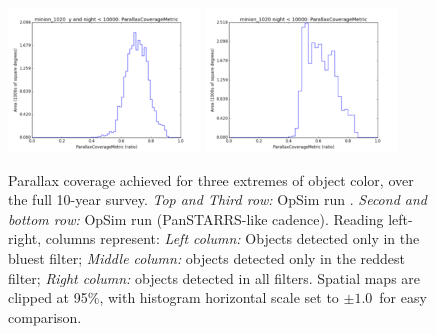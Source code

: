 \begin{figure}[ht]
\begin{center}
  \includegraphics[width=2.0in]{./figs/milkyway/astromPanels/MW_Astrom_paCovge_PanSTARRS_y_hst.png}
  \includegraphics[width=2.0in]{./figs/milkyway/astromPanels/MW_Astrom_paCovge_PanSTARRS_10y_hst.png}
  \end{center}
  \caption{Parallax coverage achieved for three extremes of object color, over the full 10-year survey. {\it Top and Third row:} OpSim run . {\it Second and bottom row:} OpSim run  (PanSTARRS-like cadence). Reading left-right, columns represent: {\it Left column:} Objects detected only in the bluest filter; {\it Middle column:} objects detected only in the reddest filter; {\it Right column:} objects detected in all filters. Spatial maps are clipped at 95\%, with histogram horizontal scale set to $\pm 1.0$~for easy comparison.}
  \label{fig_astrom_ByFilter_PACoverage}
\end{figure}


